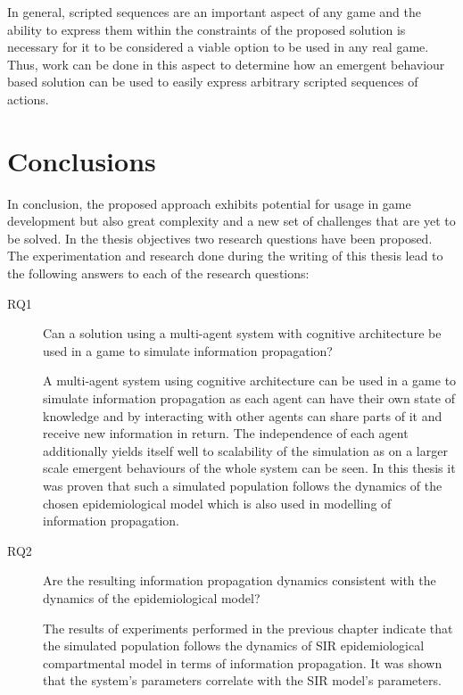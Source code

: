 In general, scripted sequences are an important aspect of any game and the ability to express them within the constraints of the proposed solution is necessary for it to be considered a viable option to be used in any real game.
Thus, work can be done in this aspect to determine how an emergent behaviour based solution can be used to easily express arbitrary scripted sequences of actions.

\section{Conclusions}

In conclusion, the proposed approach exhibits potential for usage in game development but also great complexity and a new set of challenges that are yet to be solved.
In the thesis objectives two research questions have been proposed.
The experimentation and research done during the writing of this thesis lead to the following answers to each of the research questions:

\begin{description}
    \item[RQ1] Can a solution using a multi-agent system with cognitive architecture be used in a game to simulate information propagation?
    \item[] A multi-agent system using cognitive architecture can be used in a game to simulate information propagation as each agent can have their own state of knowledge and by interacting with other agents can share parts of it and receive new information in return. The independence of each agent additionally yields itself well to scalability of the simulation as on a larger scale emergent behaviours of the whole system can be seen. In this thesis it was proven that such a simulated population follows the dynamics of the chosen epidemiological model which is also used in modelling of information propagation.
    \item[RQ2] Are the resulting information propagation dynamics consistent with the dynamics of the epidemiological model?
    \item[] The results of experiments performed in the previous chapter indicate that the simulated population follows the dynamics of SIR epidemiological compartmental model in terms of information propagation. It was shown that the system's parameters correlate with the SIR model's parameters.
\end{description}